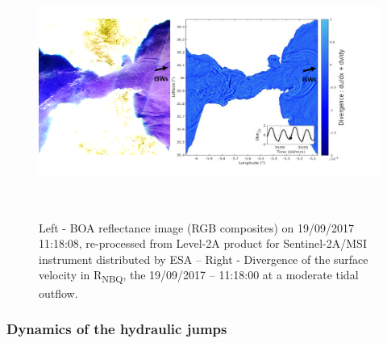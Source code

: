 \vspace{\baselineskip}



\begin{figure}[!h]
	\begin{Center}
		\includegraphics[width=6.3in,height=3.22in]{./media/image4.png}
	\end{Center}


\caption{Left - BOA reflectance image (RGB composites) on 19/09/2017 11:18:08, re-processed from Level-2A product for Sentinel-2A/MSI instrument distributed by ESA – Right -  Divergence of the surface velocity in R\textsubscript{NBQ}, the 19/09/2017 – 11:18:00 at a moderate tidal outflow. }
\label{Fig4_Lucie}
\end{figure}

\vspace{\baselineskip}
\subsubsection{Dynamics of the hydraulic jumps}


